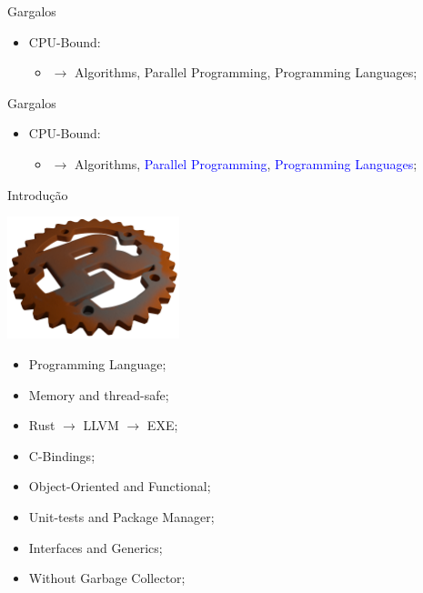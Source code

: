 \documentclass[aspectratio=169]{beamer}
\begin{document}
\begin{frame}[noframenumbering]{Gargalos}		
	\begin{itemize}
		\item CPU-Bound:
		\begin{itemize}
			\item $\rightarrow$ Algorithms, Parallel Programming, Programming Languages;
		\end{itemize}
	\end{itemize}	
\end{frame}

\begin{frame}[noframenumbering]{Gargalos}		
	\begin{itemize}
		\item CPU-Bound:
		\begin{itemize}
			\item $\rightarrow$ Algorithms, \textcolor{blue}{Parallel Programming}, \textcolor{blue}{Programming Languages};
		\end{itemize}
	\end{itemize}	
\end{frame}

\begin{frame}{Introdução}
	\begin{multicols}{2}		
		\begin{center}
			\includegraphics[width=5cm]{imgs/rust3d.png}
		\end{center}
		\footnotesize
		\begin{itemize}
			\item Programming Language;
			\item Memory and thread-safe;
			\item Rust $\rightarrow$ LLVM $\rightarrow$ EXE;
			\item C-Bindings;
			\item Object-Oriented and Functional;
			\item Unit-tests and Package Manager;
			\item Interfaces and Generics;
			\item Without Garbage Collector;
		\end{itemize}	
	\end{multicols}
\end{frame}
\end{document}
